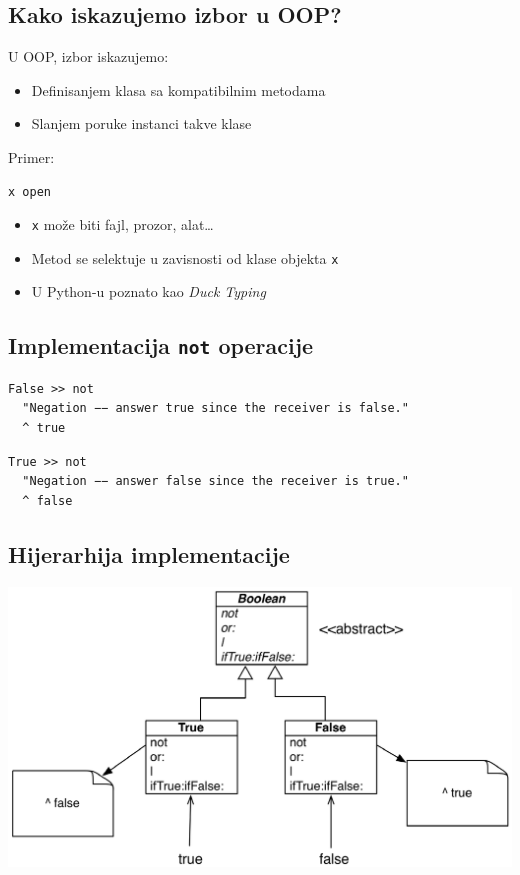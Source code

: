 \documentclass[presentation]{beamer}
\begin{document}
\subsection{Kako iskazujemo izbor u OOP?}
\label{sec:orgd70ea5b}

U OOP, izbor iskazujemo:

\begin{itemize}
\item Definisanjem klasa sa kompatibilnim metodama
\item Slanjem poruke instanci takve klase
\end{itemize}

Primer:

\begin{verbatim}
x open
\end{verbatim}

\begin{itemize}
\item \texttt{x} može biti fajl, prozor, alat\ldots{}
\item Metod se selektuje u zavisnosti od klase objekta \texttt{x}
\item U Python-u poznato kao \emph{Duck Typing}
\end{itemize}

\subsection{Implementacija \texttt{not} operacije}
\label{sec:org24bde42}

\begin{verbatim}
False >> not
  "Negation −− answer true since the receiver is false."
  ^ true
\end{verbatim}

\begin{verbatim}
True >> not
  "Negation −− answer false since the receiver is true."
  ^ false
\end{verbatim}

\subsection{Hijerarhija implementacije}
\label{sec:orge0cb7af}

\begin{center}
\includegraphics[width=.9\linewidth]{./slike/boolean_not_hierarchy.png}
\end{center}
\end{document}
